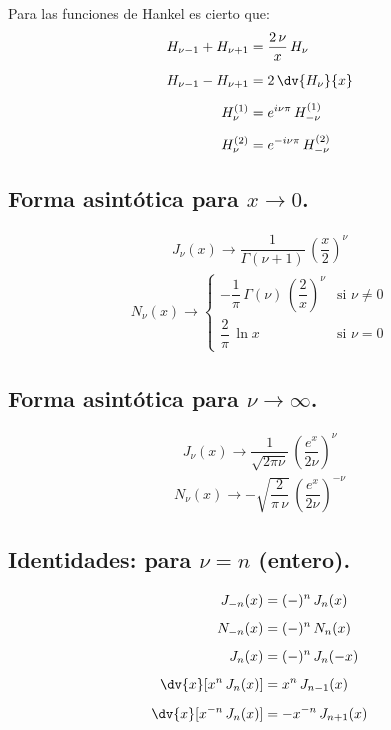 \par
Para las funciones de Hankel es cierto que:
\begin{align*}
H_{\nu-1} + H_{\nu+1} &= \dfrac{2 \, \nu}{x} \, H_{\nu} \\[0.5em]
H_{\nu-1} - H_{\nu+1} &= 2 \, \dv{H_{\nu}}{x} \\[0.5em]
H_{\nu}^{(1)} &= e^{i \nu \pi} \, H_{-\nu}^{(1)} \\[0.5em]
H_{\nu}^{(2)} &= e^{-i \nu \pi} \, H_{-\nu}^{(2)} 
\end{align*}

\subsection{Forma asintótica para \texorpdfstring{$x \to 0$}{x -> 0}.}

\begin{align*}
J_{\nu} (x) \to \dfrac{1}{\Gamma (\nu + 1)} \, \left( \dfrac{x}{2} \right)^{\nu}
\end{align*}
\begin{align*}
N_{\nu} (x) \to 
\begin{cases}
- \dfrac{1}{\pi} \, \Gamma (\nu) \, \left( \dfrac{2}{x} \right)^{\nu} & \mbox{si } \nu \neq 0  \\[0.5em]
\dfrac{2}{\pi} \, \ln x & \mbox{si } \nu = 0 
\end{cases}
\end{align*}

\subsection{Forma asintótica para \texorpdfstring{$\nu \to \infty$}{nu to infty}.}

\begin{align*}
J_{\nu} (x) \to \dfrac{1}{\sqrt{2 \pi \nu}} \, \left( \dfrac{e^{x}}{2 \nu} \right)^{\nu}
\end{align*}
\begin{align*}
N_{\nu} (x) \to - \sqrt{\dfrac{2}{\pi \, \nu}} \, \left( \dfrac{e^{x}}{2 \nu} \right)^{- \nu}
\end{align*}

\subsection{Identidades: para \texorpdfstring{$\nu = n$}{nu = n} (entero).}

\begin{align*}
J_{-n} (x) &= (-)^{n} \, J_{n}(x) \\[0.5em]
N_{-n} (x) &= (-)^{n} \, N_{n}(x) \\[0.5em]
J_{n} (x) &= (-)^{n} \, J_{n}(-x) \\[0.5em]
\dv{x} [x^{n} \, J_{n}(x)] &=  x^{n} \, J_{n-1}(x) \\[0.5em]
\dv{x} [x^{-n} \, J_{n}(x)] &=  -x^{-n} \, J_{n+1}(x)
\end{align*}

